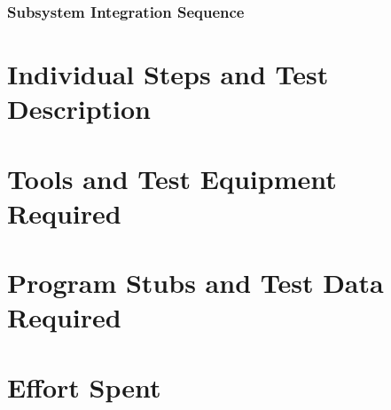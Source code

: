\documentclass{article}
\begin{document}
\begin{flushleft}
   \subsubsection{Subsystem  Integration  Sequence}		%
  
  
  \section{Individual Steps and Test Description} 		%
  \section{Tools and Test Equipment Required } 		%
  \section{Program Stubs and Test Data Required } 		%
  \section{Effort Spent} 		%
  
  
  
  
  
  
  
  
  
  
  
  
  
  
  
  
  
  
  
  
  
  
  
  
  
  
  
  
  
  
  
  
  
 \end{flushleft}
\end{document}
